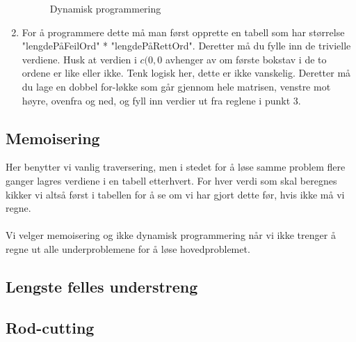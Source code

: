 \begin{enumerate}
\begin{figure}[H]
        \centering %
        \caption{Dynamisk programmering}
        \label{fig:dp}
        \end{figure}
    \item For å programmere dette må man først opprette en tabell som har størrelse "lengdePåFeilOrd" * "lengdePåRettOrd". Deretter må du fylle inn de trivielle verdiene. Husk at verdien i $c(0,0$ avhenger av om første bokstav i de to ordene er like eller ikke. Tenk logisk her, dette er ikke vanskelig. Deretter må du lage en dobbel for-løkke som går gjennom hele matrisen, venstre mot høyre, ovenfra og ned, og fyll inn verdier ut fra reglene i punkt 3.
\end{enumerate}

\subsection{Memoisering}
Her benytter vi vanlig traversering, men i stedet for å løse samme problem flere ganger lagres verdiene i en tabell etterhvert. For hver verdi som skal beregnes kikker vi altså først i tabellen for å se om vi har gjort dette før, hvis ikke må vi regne.
\\\\
Vi velger memoisering og ikke dynamisk programmering når vi ikke trenger å regne ut alle underproblemene for å løse hovedproblemet.

\subsection{Lengste felles understreng}
\subsection{Rod-cutting}